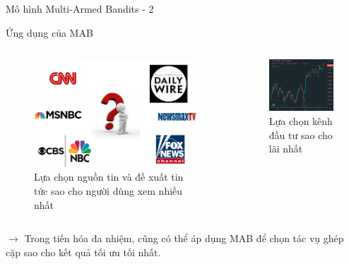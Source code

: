 \begin{frame}{Mô hình Multi-Armed Bandits - 2}
    \begin{block}{Ứng dụng của MAB}
        \begin{columns}
            \begin{column}{0.45\textwidth}
                \begin{figure}
                    \centering
                    \includegraphics[width=0.7\linewidth]{figure/preliminary/news.eps}
                    \caption{Lựa chọn nguồn tin và đề xuất tin tức sao cho người dùng xem nhiều nhất}
                    \label{fig:preliminary:news}
                \end{figure}
            \end{column}
            \begin{column}{0.45\textwidth}
                \begin{figure}
                    \centering
                    \includegraphics[width=0.7\linewidth]{figure/preliminary/eth-usd.png}
                    \caption{Lựa chọn kênh đầu tư sao cho lãi nhất}
                    \label{fig:preliminary:invest}
                \end{figure}
            \end{column}
        \end{columns}
        $\rightarrow$ Trong tiến hóa đa nhiệm, cũng có thể áp dụng MAB để chọn tác vụ ghép cặp sao cho kết quả tối ưu tối nhất.
    \end{block}
\end{frame}
